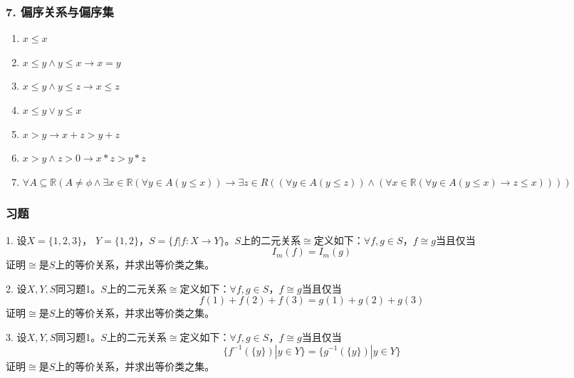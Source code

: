 \documentclass{beamer}
\begin{document}
\begin{CJK*}{UTF8}{gbsn}
\begin{frame}
\begin{enumerate}
    \end{enumerate}
  \end{frame}
  \begin{frame}
    \frametitle{7. 偏序关系与偏序集}
    \begin{enumerate}
       \item $x \leq x$
   \item $ x \leq y \land y \leq x \rightarrow x = y$
   \item $x \leq y \land y \leq z \rightarrow x \leq z$
   \item $x \leq y \lor y \leq x$ 
\item $x > y \rightarrow x + z > y + z$
\item $x > y \land z >0 \rightarrow x * z > y * z$
\item   $\forall A \subseteq \mathbb{R} (A \neq \phi \land \exists x \in \mathbb{R} (\forall y \in A (y \leq x)) \rightarrow \exists z \in R ((\forall y \in A (y \leq z) )\land ( \forall x \in \mathbb{R} (\forall y \in A (y \leq x) \rightarrow z \leq x))))$
\end{enumerate}
\end{frame}
\begin{frame}
  \frametitle{习题}
  1. 设$X = \{1,2,3\}$， $Y = \{1,2\}$，$S = \{f|f:X \to Y\}$。$S$上的二元关系$\cong$定义如下：$\forall f,g\in S$，$f \cong g$当且仅当\[I_m(f) = I_m(g)\]证明$\cong$是$S$上的等价关系，并求出等价类之集。

  2. 设$X, Y, S$同习题1。$S$上的二元关系$\cong$定义如下：$\forall f,g\in S$，$f \cong g$当且仅当\[f(1) + f(2) + f(3) = g(1) + g(2) + g(3)\]证明$\cong$是$S$上的等价关系，并求出等价类之集。

  3. 设$X, Y, S$同习题1。$S$上的二元关系$\cong$定义如下：$\forall f,g\in S$，$f \cong g$当且仅当\[\{f^{-1}(\{y\}) | y \in Y\} = \{g^{-1}(\{y\})|y \in Y\}\]证明$\cong$是$S$上的等价关系，并求出等价类之集。
\end{frame}
\end{CJK*}
\end{document}
